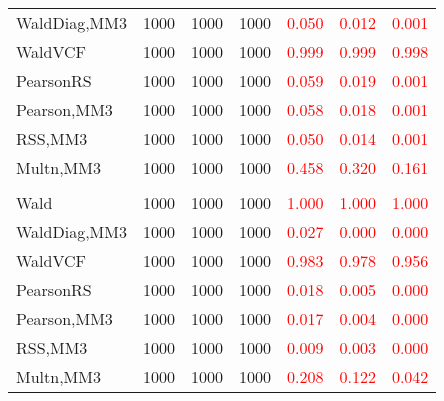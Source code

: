 \documentclass[
]{article}
\begin{document}
\begin{table}[H]
{\begin{tabular}[t]{lrrrrrr}
\hspace{1em}WaldDiag,MM3 & 1000 & 1000 & 1000 & \textcolor{red}{0.050} & \textcolor{red}{0.012} & \textcolor{red}{0.001}\\
\hspace{1em}WaldVCF & 1000 & 1000 & 1000 & \textcolor{red}{0.999} & \textcolor{red}{0.999} & \textcolor{red}{0.998}\\
\hspace{1em}PearsonRS & 1000 & 1000 & 1000 & \textcolor{red}{0.059} & \textcolor{red}{0.019} & \textcolor{red}{0.001}\\
\hspace{1em}Pearson,MM3 & 1000 & 1000 & 1000 & \textcolor{red}{0.058} & \textcolor{red}{0.018} & \textcolor{red}{0.001}\\
\hspace{1em}RSS,MM3 & 1000 & 1000 & 1000 & \textcolor{red}{0.050} & \textcolor{red}{0.014} & \textcolor{red}{0.001}\\
\hspace{1em}Multn,MM3 & 1000 & 1000 & 1000 & \textcolor{red}{0.458} & \textcolor{red}{0.320} & \textcolor{red}{0.161}\\
\addlinespace[0.3em]
\multicolumn{7}{l}{\textbf{3F 15V}}\\
\hspace{1em}Wald & 1000 & 1000 & 1000 & \textcolor{red}{1.000} & \textcolor{red}{1.000} & \textcolor{red}{1.000}\\
\hspace{1em}WaldDiag,MM3 & 1000 & 1000 & 1000 & \textcolor{red}{0.027} & \textcolor{red}{0.000} & \textcolor{red}{0.000}\\
\hspace{1em}WaldVCF & 1000 & 1000 & 1000 & \textcolor{red}{0.983} & \textcolor{red}{0.978} & \textcolor{red}{0.956}\\
\hspace{1em}PearsonRS & 1000 & 1000 & 1000 & \textcolor{red}{0.018} & \textcolor{red}{0.005} & \textcolor{red}{0.000}\\
\hspace{1em}Pearson,MM3 & 1000 & 1000 & 1000 & \textcolor{red}{0.017} & \textcolor{red}{0.004} & \textcolor{red}{0.000}\\
\hspace{1em}RSS,MM3 & 1000 & 1000 & 1000 & \textcolor{red}{0.009} & \textcolor{red}{0.003} & \textcolor{red}{0.000}\\
\hspace{1em}Multn,MM3 & 1000 & 1000 & 1000 & \textcolor{red}{0.208} & \textcolor{red}{0.122} & \textcolor{red}{0.042}\\
\bottomrule
\end{tabular}}
\endgroup{}
\end{table}
\end{document}
